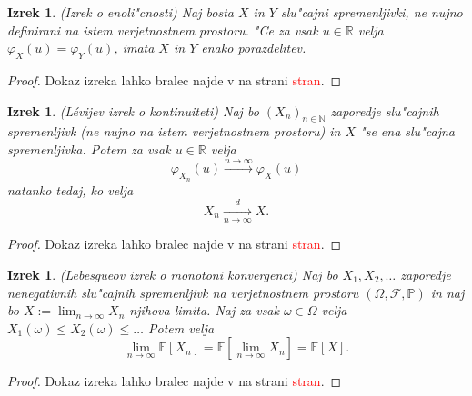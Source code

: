 \documentclass[12pt, a4paper, reqno]{amsart}
\theoremstyle{definition}
\theoremstyle{plain}
\newtheorem{izrek}[definicija]{Izrek}
\newcommand{\R}{\mathbb{R}}
\newcommand{\N}{\mathbb{N}}
\newcommand{\E}{\mathbb{E}}
\newcommand{\Prob}{\mathbb{P}}
\newcommand{\1}{\mathds{1}}
\begin{document}
    \begin{izrek}(Izrek o enoli"cnosti)
        Naj bosta $X$ in $Y$ slu"cajni spremenljivki, ne nujno definirani na istem verjetnostnem prostoru.
        "Ce za vsak $u\in\R$ velja $\varphi_X(u) = \varphi_Y(u)$, imata $X$ in $Y$ enako porazdelitev.
        \label{izr:enolicnost}
    \end{izrek}

    \begin{proof}
        Dokaz izreka lahko bralec najde v \cite{7} na strani \textcolor{red}{stran}.
    \end{proof}

    \begin{izrek}(Lévijev izrek o kontinuiteti)
        Naj bo $(X_n)_{n\in\N}$ zaporedje slu"cajnih spremenljivk (ne nujno na istem verjetnostnem prostoru)
        in $X$ "se ena slu"cajna spremenljivka. Potem za vsak $u\in\R$ velja
        \begin{equation*}
            \varphi_{X_n}(u) \xrightarrow{n\to\infty} \varphi_X(u) 
        \end{equation*}
        natanko tedaj, ko velja
        \begin{equation*}
            X_n \xrightarrow[n\to\infty]{d} X.
        \end{equation*}
        \label{izr:LevijevIzrek}
    \end{izrek}

    \begin{proof}
        Dokaz izreka lahko bralec najde v \cite{7} na strani \textcolor{red}{stran}.
    \end{proof}

    \begin{izrek}(Lebesgueov izrek o monotoni konvergenci)
        Naj bo $X_1, X_2, \dots $ zaporedje nenegativnih slu"cajnih spremenljivk na 
        verjetnostnem prostoru $(\Omega, \mathcal{F}, \Prob)$ in naj bo $X:= \lim_{n\to\infty}X_n$ 
        njihova limita. Naj za vsak $\omega \in \Omega$
        velja $X_1(\omega) \leq X_2(\omega) \leq \dots$ Potem velja 
        \begin{equation*}
            \lim_{n\to\infty}\E\left[X_n\right] = \E\left[\lim_{n\to\infty}X_n\right] = \E\left[X\right].
        \end{equation*}
        \label{izr:monotonaKonvergenca}
    \end{izrek}

    \begin{proof}
        Dokaz izreka lahko bralec najde v \cite{7} na strani \textcolor{red}{stran}.
    \end{proof}  
\end{document}
